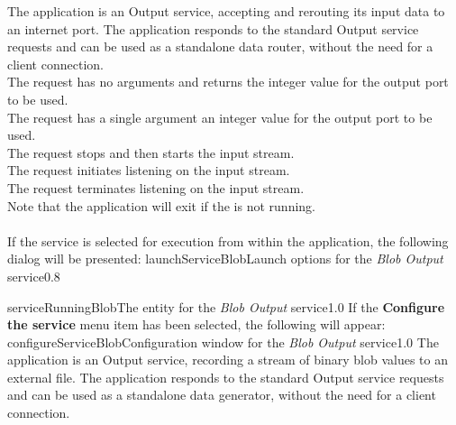 The  application is an Output service, accepting and
rerouting its input data to an internet port.
The application responds to the standard Output service requests and can be used as a
standalone data router, without the need for a client connection.\\

The  request has no arguments and
returns the integer value for the output port to be used.\\

The  request has a single argument
\longDash{} an integer value for the output port to be used.\\

The  request stops and then
starts the input stream.\\

The  request initiates listening
on the input stream.\\

The  request terminates listening
on the input stream.\\

Note that the application will exit if the  is not
running.\\

\insertAppParameters
{}
\insertOutputServiceComment\\

\insertStandardServiceCommands
\condPage
If the service is selected for execution from within the \emph{\MMMU} application, the
following dialog will be presented:
%
{launchServiceBlob}{Launch options for the \emph{Blob Output} service}{0.8}

%
{serviceRunningBlob}{The \emph{\MMMU} entity for the \emph{Blob Output} service}{1.0}
\condPage{}
If the \textbf{Configure the service} menu item has been selected, the following will
appear:
%
{configureServiceBlob}{Configuration window for the \emph{Blob Output} service}{1.0}
\condPage
{}
The  application is an Output service, recording
a stream of \yarp{} binary blob values to an external file.
The application responds to the standard Output service requests and can be used as a
standalone data generator, without the need for a client connection.\\

